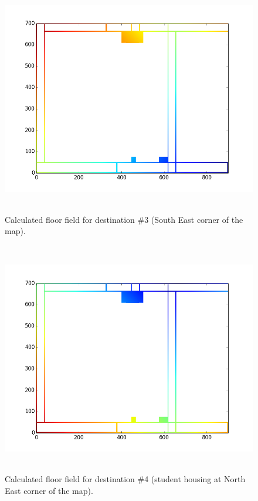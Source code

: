 \documentclass[paper=a4, fontsize=11pt]{scrartcl}
\numberwithin{equation}{section}		%
\numberwithin{figure}{section}			%
\numberwithin{table}{section}		    %
\begin{document}
\begin{appendices}
\begin{figure}[H]
	\begin{center}
		\includegraphics[height=4in,width=5.5in]{floor_field_dest3} 
		\caption{Calculated floor field for destination \#3 
			(South East corner of the map).\label{fig:A:ff3}}
	\end{center} 
\end{figure}

\begin{figure}[H]
	\begin{center}
		\includegraphics[height=4in,width=5.5in]{floor_field_dest4} 
		\caption{Calculated floor field for destination \#4 
			(student housing at North East corner of the map).\label{fig:A:ff4}}
	\end{center} 
\end{figure}

\end{appendices}  

\newpage
 

	
\end{document}

